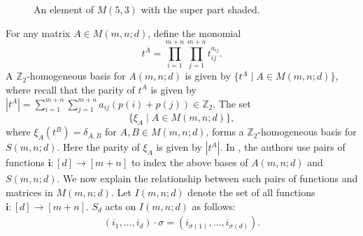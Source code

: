 \documentclass[12pt,reqno]{amsart}
\theoremstyle{definition}
\theoremstyle{remark}
\begin{document}
\begin{figure}[h]
\centering
{}

\caption{An element of $M(5,3)$ with the super part shaded.}
\label{fig:block-matrix}

\end{figure}

For any matrix $A\in M(m,n;d)$, define the monomial
\begin{equation}\label{eq:monomial}
    t^A = \prod_{i=1}^{m+n}\prod_{j=1}^{m+n}t_{ij}^{a_{ij}}.
\end{equation}
A $\mathbb{Z}_{2}$-homogeneous basis for $A(m,n;d)$ is given by $\{t^A\mid A\in M(m,n;d)\}$, where recall that the parity of $t^A$ is given by $|t^{A}|=\sum_{i=1}^{m+n}\sum_{j=1}^{m+n}a_{ij}(p(i)+p(j))\in\mathbb{Z}_2$. The set $$\{\xi_{A}\mid A\in M(m,n;d)\},$$ where $\xi_{A}(t^{B})=\delta_{A,B}$ for $A,B\in M(m,n;d)$, forms a $\mathbb{Z}_2$-homogeneous basis for $S(m,n;d)$. Here the parity of $\xi_{A}$ is given by $|t^{A}|$. In \cite{brundan2003new}, the authors use pairs of functions $\mathbf{i}:[d]\xrightarrow[]{}[m+n]$ to index the above bases of $A(m,n;d)$ and $S(m,n;d)$. We now explain the relationship between such pairs of functions and matrices in $M(m,n;d)$. Let $I(m,n;d)$ denote the set of all functions $\mathbf{i}:[d]\xrightarrow[]{}[m+n]$. $S_{d}$ acts on $I(m,n;d)$ as follows:
$$(i_{1},\dotsc,i_{d})\cdot\sigma=(i_{\sigma(1)},\dotsc,i_{\sigma(d)}). $$
\end{document}
